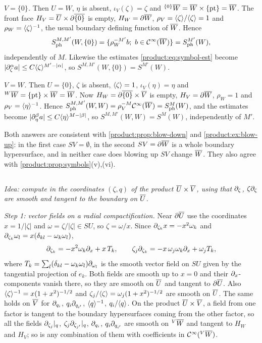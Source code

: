 \emph{$V=\{0\}$.} Then $U=W$, $\eta$ is absent, $\iota_V(\zeta)=\zeta$ and
${}^{\{0\}}\overline{W}=\overline{W}\times\{\text{pt}\}=\overline{W}$. The front face
$H_V=\overline{U}\times\partial\overline{\{0\}}$ is empty, $H_W=\partial\overline{W}$, $\rho_V=\langle \zeta\rangle/\langle \zeta\rangle=1$
and $\rho_W=\langle \zeta\rangle^{-1}$, the usual boundary defining function of $\overline{W}$. Hence
\begin{equation*}
S^{M,M'}_{\mathrm{ph}}(W,\{0\})=\{\rho_W^{-M'}b;\ b\in\CI(\RC W)\}=\Symph{M'}(W),
\end{equation*}
independently of $M$. Likewise the estimates \eqref{product:eq:symbol-est} become
$|\partial_\zeta^\alpha a|\le C\langle \zeta\rangle^{M'-|\alpha|}$, so $S^{M,M'}(W,\{0\})=S^{M'}(W)$.

\emph{$V=W$.} Then $U=\{0\}$, $\zeta$ is absent, $\langle \zeta\rangle=1$, $\iota_V(\eta)=\eta$
and ${}^{W}\overline{W}=\{\text{pt}\}\times\overline{W}=\overline{W}$. Now $H_W=\partial\overline{\{0\}}\times\overline{V}$ is
empty, $H_V=\partial\overline{W}$, $\rho_W=1$ and $\rho_V=\langle \eta\rangle^{-1}$. Hence
$S^{M,M'}_{\mathrm{ph}}(W,W)=\rho_V^{-M}\mathcal{C}^\infty(\overline{W})=S^{M}_{\mathrm{ph}}(W)$, and the estimates
become $|\partial_\eta^\beta a|\le C\langle \eta\rangle^{M-|\beta|}$, so $S^{M,M'}(W,W)=S^M(W)$,
independently of $M'$.

Both answers are consistent with \cref{product:prop:blow-down} and
\cref{product:ex:blow-up}: in the first case $SV=\emptyset$, in the second $SV=\partial\overline{W}$ is a whole boundary hypersurface, and in neither case does blowing up $SV$ change
$\overline{W}$. They also agree with \cref{product:prop:symbols}(v),(vi).

\subsection*{}
\emph{Idea: compute in the coordinates $(\zeta,q)$ of the product
$\overline{U}\times\overline{V}$, using that $\partial_\zeta$, $\zeta\partial_\zeta$ are smooth and tangent
to the boundary on $\overline{U}$.}

\emph{Step 1: vector fields on a radial compactification.} Near $\partial\overline{U}$ use the
coordinates $x=1/|\zeta|$ and $\omega=\zeta/|\zeta|\in SU$, so $\zeta=\omega/x$.
Since $\partial_{\zeta_k}x=-x^2\omega_k$ and $\partial_{\zeta_k}\omega_l=x(\delta_{kl}-\omega_k\omega_l)$,
\begin{equation*}
\partial_{\zeta_k}=-x^2\omega_k\partial_x+x\,T_k,\qquad
\zeta_j\partial_{\zeta_k}=-x\,\omega_j\omega_k\partial_x+\omega_jT_k,
\end{equation*}
where $T_k=\sum_l(\delta_{kl}-\omega_k\omega_l)\partial_{\omega_l}$ is the smooth vector
field on $SU$ given by the tangential projection of $e_k$. Both fields are smooth up
to $x=0$ and their $\partial_x$-components vanish there, so they are smooth on $\overline{U}$
and tangent to $\partial\overline{U}$. Also $\langle \zeta\rangle^{-1}=x(1+x^2)^{-1/2}$ and
$\zeta_j/\langle \zeta\rangle=\omega_j(1+x^2)^{-1/2}$ are smooth on $\overline{U}$. The same holds on
$\overline{V}$ for $\partial_{q_i}$, $q_i\partial_{q_{i'}}$, $\langle q\rangle^{-1}$, $q_i/\langle q\rangle$. On the
product $\overline{U}\times\overline{V}$, a field from one factor is tangent to the boundary
hypersurfaces coming from the other factor, so all the fields
$\partial_{\zeta_j}|_q$, $\zeta_j\partial_{\zeta_{j'}}|_q$, $\partial_{q_i}$, $q_i\partial_{q_{i'}}$ are
smooth on ${}^{V}\overline{W}$ and tangent to $H_W$ and $H_V$; so is any combination of them
with coefficients in $\mathcal{C}^\infty({}^{V}\overline{W})$.

